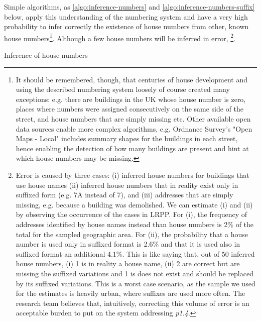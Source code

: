 Simple algorithms, as \ref{algo:inference-numbers} and \ref{algo:inference-numbers-suffix} below, apply this understanding of the numbering system and have a very high probability to infer correctly the existence of house numbers from other, known house numbers\footnote{It should be remembered, though, that centuries of house development and using the described numbering system loosely of course created many exceptions: e.g. there are buildings in the UK whose house number is zero, places where numbers were assigned consecutively on the same side of the street, and house numbers that are simply missing etc. Other available open data sources enable more complex algorithms, e.g. Ordnance Survey's "Open Maps - Local" includes summary shapes for the buildings in each street, hence enabling the detection of how many buildings are present and hint at which house numbers may be missing.}. Although a few house numbers will be inferred in error, \footnote{Error is caused by three cases: (i) inferred house numbers for buildings that use house names (ii) inferred house numbers that in reality exist only in suffixed form (e.g. 7A instead of 7), and (iii) addresses that are simply missing, e.g. because a building was demolished. We can estimate (i) and (ii) by observing the occurrence of the cases in LRPP. For (i), the frequency of addresses identified by house names instead than house numbers is 2\% of the total for the sampled geographic area. For (ii), the probability that a house number is used only in suffixed format is 2.6\% and that it is used also in suffixed format an additional 4.1\%. This is like saying that, out of 50 inferred house numbers, (i) 1 is in reality a house name, (ii) 2 are correct but are missing the suffixed variations and 1 is does not exist and should be replaced by its suffixed variations. This is a worst case scenario, as the sample we used for the estimates is heavily urban, where suffixes are used more often. The research team believes that, intuitively, correcting this volume of error is an acceptable burden to put on the system addressing {\it p1.4}.}.

\vspace{5mm}

\begin{algorithm}[H]
    \caption{Inference of house numbers}
    \label{algo:inference-numbers}
\end{algorithm}

